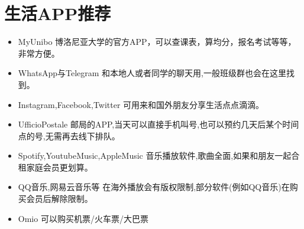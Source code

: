 \section{生活APP推荐}
\begin{itemize}
\item MyUnibo 博洛尼亚大学的官方APP，可以查课表，算均分，报名考试等等，非常方便。
\item WhatsApp与Telegram 和本地人或者同学的聊天用,一般班级群也会在这里找到。
\item Instagram,Facebook,Twitter 可用来和国外朋友分享生活点点滴滴。
\item UfficioPostale 邮局的APP,当天可以直接手机叫号,也可以预约几天后某个时间点的号,无需再去线下排队。
\item Spotify,YoutubeMusic,AppleMusic 音乐播放软件,歌曲全面,如果和朋友一起合租家庭会员更划算。
\item QQ音乐,网易云音乐等 在海外播放会有版权限制,部分软件(例如QQ音乐)在购买会员后解除限制。
\item Omio 可以购买机票/火车票/大巴票
\end{itemize}





